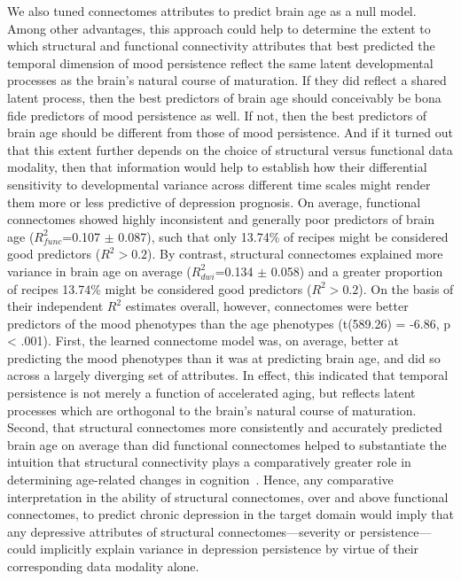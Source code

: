 \documentclass[
  notitlepage]{article}
\begin{document}
We also tuned connectomes attributes to predict brain age as a null
model. Among other advantages, this approach could help to determine the
extent to which structural and functional connectivity attributes that
best predicted the temporal dimension of mood persistence reflect the
same latent developmental processes as the brain's natural course of
maturation. If they did reflect a shared latent process, then the best
predictors of brain age should conceivably be bona fide predictors of
mood persistence as well. If not, then the best predictors of brain age
should be different from those of mood persistence. And if it turned out
that this extent further depends on the choice of structural versus
functional data modality, then that information would help to establish
how their differential sensitivity to developmental variance across
different time scales might render them more or less predictive of
depression prognosis. On average, functional connectomes showed highly
inconsistent and generally poor predictors of brain age
(\(R^{2}_{func}\)=0.107 \(\pm\) 0.087), such that only 13.74\% of
recipes might be considered good predictors (\(R^{2}>0.2\)). By
contrast, structural connectomes explained more variance in brain age on
average (\(R^{2}_{dwi}\)=0.134 \(\pm\) 0.058) and a greater proportion
of recipes 13.74\% might be considered good predictors (\(R^{2}>0.2\)).
On the basis of their independent \(R^{2}\) estimates overall, however,
connectomes were better predictors of the mood phenotypes than the age
phenotypes (t(589.26) = -6.86, p \textless{} .001). First, the learned
connectome model was, on average, better at predicting the mood
phenotypes than it was at predicting brain age, and did so across a
largely diverging set of attributes. In effect, this indicated that
temporal persistence is not merely a function of accelerated aging, but
reflects latent processes which are orthogonal to the brain's natural
course of maturation. Second, that structural connectomes more
consistently and accurately predicted brain age on average than did
functional connectomes helped to substantiate the intuition that
structural connectivity plays a comparatively greater role in
determining age-related changes in
cognition~\cite{Kaiser2020}. Hence, any comparative
interpretation in the ability of structural connectomes, over and above
functional connectomes, to predict chronic depression in the target
domain would imply that any depressive attributes of structural
connectomes---severity or persistence---could implicitly explain
variance in depression persistence by virtue of their corresponding data
modality alone.
\end{document}
